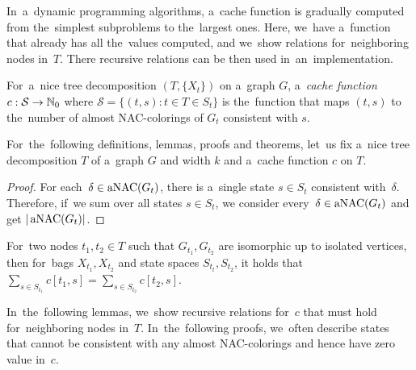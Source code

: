 In~a~dynamic programming algorithms, a~cache function is gradually computed
from the~simplest subproblems to the~largest ones.
Here, we~have a~function that already has all the~values computed,
and we~show relations for~neighboring nodes in~\( T \).
There recursive relations can be then used in~an~implementation.
%
\begin{definition}
	For~a~nice tree decomposition \( (T, \{X_t\}) \) on a~graph \( G \),
	a~\emph{cache function} \( c: \mathcal{S} \to \mathbb{N}_0 \)
	where \( \mathcal{S} = \{ (t,s): t \in T \in S_t \} \)
	is the~function that maps \( (t, s) \)
	to the~number of almost NAC-colorings of \( G_t \) consistent with \( s \).
\end{definition}
%
For~the~following definitions, lemmas, proofs and theorems, let~us fix
a~nice tree decomposition \( T \) of a~graph \( G \) and width \( k \)
and a~cache function \( c \) on \( T \).
%
%
\begin{proof}
	For each~\( \delta \in \operatorname{aNAC}(G_t) \),
	there is a~single state \( s \in S_t \) consistent with~\( \delta \).
	Therefore, if~we sum over all states \( s \in S_t \),
	we consider every~\( \delta \in \operatorname{aNAC}(G_t) \) and get \( |\operatorname{aNAC}(G_t)| \).
\end{proof}
%
\begin{observation}
	For~two nodes \( t_1, t_2 \in T \) such that \( G_{t_1}, G_{t_2} \)
	are isomorphic up to isolated vertices,
	then for~bags \( X_{t_1}, X_{t_2} \) and state spaces \( S_{t_t}, S_{t_2} \),
	it holds that \( \sum_{s \in S_{t_1}} c[t_1, s] = \sum_{s \in S_{t_2}} c[t_2, s] \).
\end{observation}
%
%

In~the~following lemmas, we~show recursive relations for~\( c \) that must hold
for~neighboring nodes in~\( T \).
%
In~the~following proofs,
we~often describe states that cannot be consistent with
any almost NAC-colorings and hence have zero value in~\( c \).

